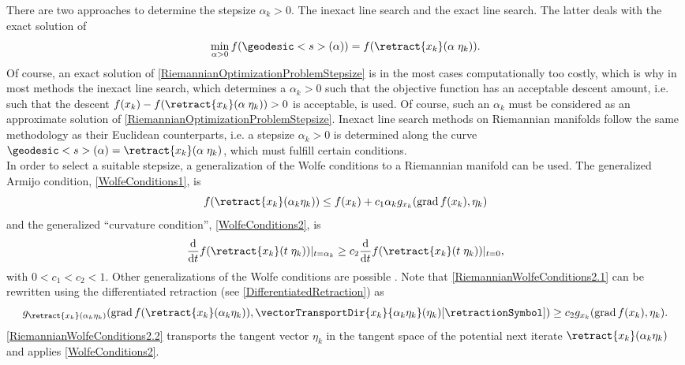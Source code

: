 There are two approaches to determine the stepsize $\alpha_k > 0$. The inexact line search and the exact line search. The latter deals with the exact solution of 
\begin{equation}\label{RiemannianOptimizationProblemStepsize}
    \min_{\alpha > 0} f(\geodesic<s>(\alpha)) = f(\retract{x_k}(\alpha \; \eta_k)).
\end{equation}
Of course, an exact solution of \cref{RiemannianOptimizationProblemStepsize} is in the most cases computationally too costly, which is why in most methods the inexact line search, which determines a $\alpha_k > 0$ such that the objective function has an acceptable descent amount, i.e. such that the descent $f(x_k) - f(\retract{x_k}(\alpha \; \eta_k)) > 0$ is acceptable, is used. Of course, such an $\alpha_k$ must be considered as an approximate solution of \cref{RiemannianOptimizationProblemStepsize}. Inexact line search methods on Riemannian manifolds follow the same methodology as their Euclidean counterparts, i.e. a stepsize $\alpha_k > 0$ is determined along the curve $\geodesic<s>(\alpha) = \retract{x_k}(\alpha \; \eta_k)$, which must fulfill certain conditions. \\
In order to select a suitable stepsize, a generalization of the Wolfe conditions to a Riemannian manifold can be used. The generalized Armijo condition, \cref{WolfeConditions1}, is
\begin{equation}\label{RiemannianWolfeConditions1}
    f( \retract{x_k}(\alpha_k \eta_k)) \leq f(x_k) + c_1 \alpha_k g_{x_k} (\operatorname{grad} f(x_k), \eta_k)
\end{equation}
and the generalized “curvature condition”, \cref{WolfeConditions2}, is
\begin{equation}\label{RiemannianWolfeConditions2.1}
    \frac{\mathrm{d}}{\mathrm{d}t} f(\retract{x_k}(t \; \eta_k)) \vert_{t=\alpha_k} \geq c_2 \frac{\mathrm{d}}{\mathrm{d}t} f(\retract{x_k}(t \; \eta_k)) \vert_{t=0},
\end{equation}
with $0 < c_1 < c_2 < 1$. Other generalizations of the Wolfe conditions are possible \cite[p.~12]{Qi:2011}. Note that \cref{RiemannianWolfeConditions2.1} can be rewritten using the differentiated retraction (see \cref{DifferentiatedRetraction}) as
\begin{equation}\label{RiemannianWolfeConditions2.2}
    g_{\retract{x_k}(\alpha_k \eta_k)} (\operatorname{grad} f(\retract{x_k}(\alpha_k \eta_k)), \vectorTransportDir{x_k}{\alpha_k \eta_k}(\eta_k)[\retractionSymbol]) \geq c_2 g_{x_k} (\operatorname{grad} f(x_k), \eta_k).
\end{equation}
\cref{RiemannianWolfeConditions2.2} transports the tangent vector $\eta_k$ in the tangent space of the potential next iterate $\retract{x_k}(\alpha_k \eta_k)$ and applies \cref{WolfeConditions2}. \\

